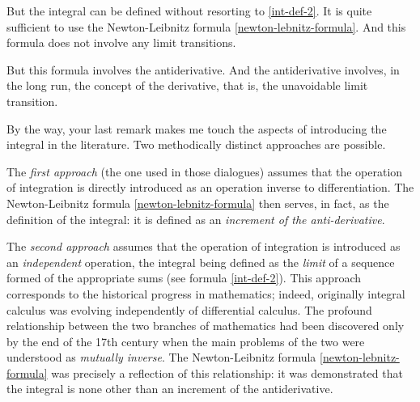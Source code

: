 \rdr But the integral can be defined without resorting to  \eqref{int-def-2}. It is quite sufficient to use the Newton-Leibnitz formula \eqref{newton-lebnitz-formula}. And this formula does not involve any limit transitions.

\athr But this formula involves the antiderivative. And the antiderivative involves, in the long run, the concept of the derivative, that is, the unavoidable limit transition.

By the way, your last remark makes me touch the aspects of introducing the integral in the literature. Two methodically distinct approaches are possible. 

The \emph{first approach} (the one used in those dialogues) assumes
that the operation of integration is directly introduced as an operation inverse to differentiation. The Newton-Leibnitz formula \eqref{newton-lebnitz-formula} then serves, in fact, as the definition of the integral: it is defined as an \emph{increment of the anti-derivative}.

The \emph{second approach} assumes that the operation of integration is introduced as an \emph{independent} operation, the integral being defined as the \emph{limit} of a sequence formed of the appropriate sums (see formula  \eqref{int-def-2}). This approach corresponds to the historical progress in mathematics; indeed, originally integral calculus was evolving independently of differential calculus. The profound relationship between the two branches of mathematics had been discovered only by the end of the 17th century when the main problems of the two were understood as \emph{mutually inverse}. The Newton-Leibnitz formula \eqref{newton-lebnitz-formula} was precisely a reflection of this relationship: it was demonstrated that the integral is none other than an increment of the antiderivative.